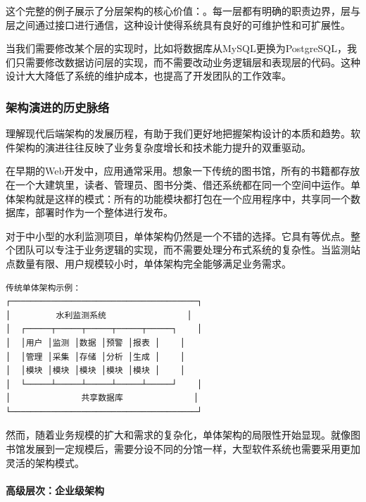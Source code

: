 这个完整的例子展示了分层架构的核心价值：。每一层都有明确的职责边界，层与层之间通过接口进行通信，这种设计使得系统具有良好的可维护性和可扩展性。

当我们需要修改某个层的实现时，比如将数据库从MySQL更换为PostgreSQL，我们只需要修改数据访问层的实现，而不需要改动业务逻辑层和表现层的代码。这种设计大大降低了系统的维护成本，也提高了开发团队的工作效率。

\hypertarget{ux67b6ux6784ux6f14ux8fdbux7684ux5386ux53f2ux8109ux7edc}{%
\subsubsection{架构演进的历史脉络}\label{ux67b6ux6784ux6f14ux8fdbux7684ux5386ux53f2ux8109ux7edc}}

理解现代后端架构的发展历程，有助于我们更好地把握架构设计的本质和趋势。软件架构的演进往往反映了业务复杂度增长和技术能力提升的双重驱动。

在早期的Web开发中，应用通常采用。想象一下传统的图书馆，所有的书籍都存放在一个大建筑里，读者、管理员、图书分类、借还系统都在同一个空间中运作。单体架构就是这样的模式：所有的功能模块都打包在一个应用程序中，共享同一个数据库，部署时作为一个整体进行发布。

对于中小型的水利监测项目，单体架构仍然是一个不错的选择。它具有等优点。整个团队可以专注于业务逻辑的实现，而不需要处理分布式系统的复杂性。当监测站点数量有限、用户规模较小时，单体架构完全能够满足业务需求。

\begin{lstlisting}
传统单体架构示例：
┌─────────────────────────────────────┐
│         水利监测系统                │
│  ┌─────┬─────┬─────┬─────┬─────┐    │
│  │用户 │监测 │数据 │预警 │报表 │    │
│  │管理 │采集 │存储 │分析 │生成 │    │
│  │模块 │模块 │模块 │模块 │模块 │    │
│  └─────┴─────┴─────┴─────┴─────┘    │
│              共享数据库              │
└─────────────────────────────────────┘
\end{lstlisting}

然而，随着业务规模的扩大和需求的复杂化，单体架构的局限性开始显现。就像图书馆发展到一定规模后，需要分设不同的分馆一样，大型软件系统也需要采用更加灵活的架构模式。

\hypertarget{ux9ad8ux7ea7ux5c42ux6b21ux4f01ux4e1aux7ea7ux67b6ux6784}{%
\paragraph{高级层次：企业级架构}\label{ux9ad8ux7ea7ux5c42ux6b21ux4f01ux4e1aux7ea7ux67b6ux6784}}

